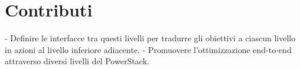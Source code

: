 \section{Contributi}
- Definire le interfacce tra questi livelli per tradurre gli obiettivi a ciascun livello in azioni al livello inferiore adiacente.
- Promuovere l'ottimizzazione end-to-end attraverso diversi livelli del PowerStack.



